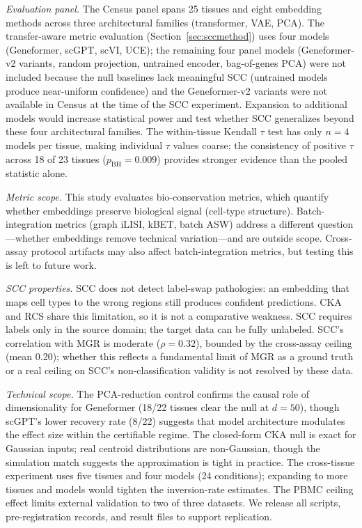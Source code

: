 \documentclass[11pt]{article}
\begin{document}
\emph{Evaluation panel.} The Census panel spans 25 tissues and eight
embedding methods across three architectural families (transformer, VAE,
PCA). The transfer-aware metric evaluation
(Section~\ref{sec:sccmethod}) uses four models (Geneformer, scGPT,
scVI, UCE); the remaining four panel models (Geneformer-v2 variants,
random projection, untrained encoder, bag-of-genes PCA) were not
included because the null baselines lack meaningful SCC (untrained
models produce near-uniform confidence) and the Geneformer-v2 variants
were not available in Census at the time of the SCC experiment.
Expansion to additional models would increase statistical power and
test whether SCC generalizes beyond these four architectural families.
The within-tissue Kendall $\tau$ test has only $n = 4$ models per
tissue, making individual $\tau$ values coarse; the consistency of
positive $\tau$ across 18 of 23 tissues ($p_{\text{BH}} = 0.009$)
provides stronger evidence than the pooled statistic alone.

\emph{Metric scope.} This study evaluates bio-conservation metrics,
which quantify whether embeddings preserve biological signal (cell-type
structure). Batch-integration metrics (graph iLISI, kBET, batch ASW)
address a different question---whether embeddings remove technical
variation---and are outside scope. Cross-assay protocol artifacts may
also affect batch-integration metrics, but testing this is left to
future work.

\emph{SCC properties.} SCC does not detect label-swap pathologies: an
embedding that maps cell types to the wrong regions still produces
confident predictions. CKA and RCS share this limitation, so it is not
a comparative weakness. SCC requires labels only in the source domain;
the target data can be fully unlabeled. SCC's correlation with MGR is
moderate ($\rho = 0.32$), bounded by the cross-assay ceiling (mean
0.20); whether this reflects a fundamental limit of MGR as a ground
truth or a real ceiling on SCC's non-classification validity is not
resolved by these data.

\emph{Technical scope.} The PCA-reduction control confirms the causal
role of dimensionality for Geneformer (18/22 tissues clear the null at
$d = 50$), though scGPT's lower recovery rate (8/22) suggests that
model architecture modulates the effect size within the certifiable
regime. The closed-form CKA null is exact for Gaussian inputs; real
centroid distributions are non-Gaussian, though the simulation match
suggests the approximation is tight in practice. The cross-tissue
experiment uses five tissues and four models (24 conditions); expanding
to more tissues and models would tighten the inversion-rate estimates.
The PBMC ceiling effect limits external validation to two of three
datasets. We release all scripts, pre-registration records, and result
files to support replication.
\end{document}
